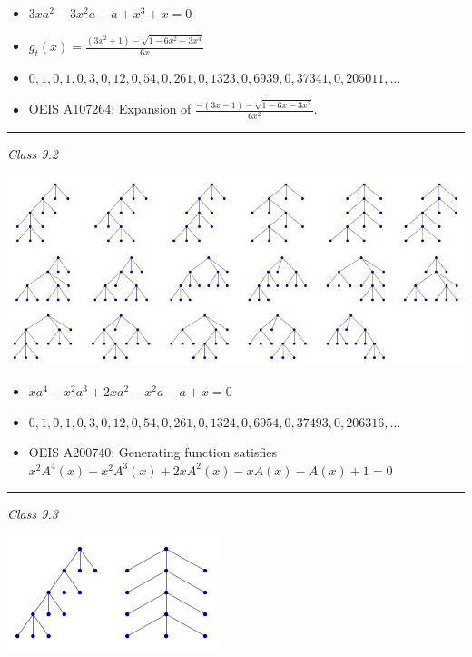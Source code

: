 \documentclass[12pt]{article}
\begin{document}
\begin{itemize}
\item $ 3xa^2-3x^2a-a+x^3+x=0$
\item $g_t(x)=\frac{(3x^2+1)- \sqrt{1-6x^2-3x^4}}{6x}$
\item $0, 1, 0, 1, 0, 3, 0, 12, 0, 54, 0, 261, 0, 1323, 0, 6939, 0, 37341, 0, 205011, \dots$
\item OEIS A107264:	Expansion of $\frac{-(3x-1)-\sqrt{1-6x-3x^2}}{6 x^2}$. 
\end{itemize}

\hrule 
\vspace{5mm}

\textit{Class 9.2}

\begin{center}
\includegraphics{ternary_class_9-2}
\end{center}

\begin{itemize}
\item $xa^4-x^2a^3+2xa^2-x^2a-a+x=0$
\item $0, 1, 0, 1, 0, 3, 0, 12, 0, 54, 0, 261, 0, 1324, 0, 6954, 0, 37493, 0, 206316, \dots$
\item OEIS A200740: Generating function satisfies $x^2A^4(x)-x^2A^3(x)+2xA^2(x)-xA(x)-A(x)+1=0$
\end{itemize}

\hrule 

\vspace{5mm}

\textit{Class 9.3}

\begin{center}
\includegraphics{ternary_class_9-3}
\end{center}
\end{document}
